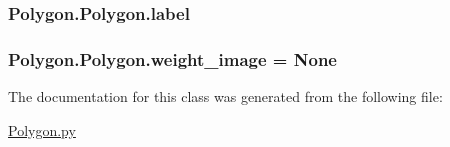 \subsubsection[{label}]{\setlength{\rightskip}{0pt plus 5cm}Polygon.\+Polygon.\+label}\label{class_polygon_1_1_polygon_a23c2f3cec7fb964a87c1dae19dbb8180}
\hypertarget{class_polygon_1_1_polygon_a1e1c90b4131cd111e9841e17bf38da52}{}
\subsubsection[{weight\+\_\+image}]{\setlength{\rightskip}{0pt plus 5cm}Polygon.\+Polygon.\+weight\+\_\+image = None\hspace{0.3cm}{\ttfamily [static]}}\label{class_polygon_1_1_polygon_a1e1c90b4131cd111e9841e17bf38da52}


The documentation for this class was generated from the following file\+:\begin{DoxyCompactItemize}
\item 
\hyperlink{_polygon_8py}{Polygon.\+py}\end{DoxyCompactItemize}
